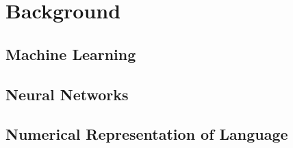 \chapter{Background}
\section{Machine Learning}

\section{Neural Networks}

\section{Numerical Representation of Language}

%
